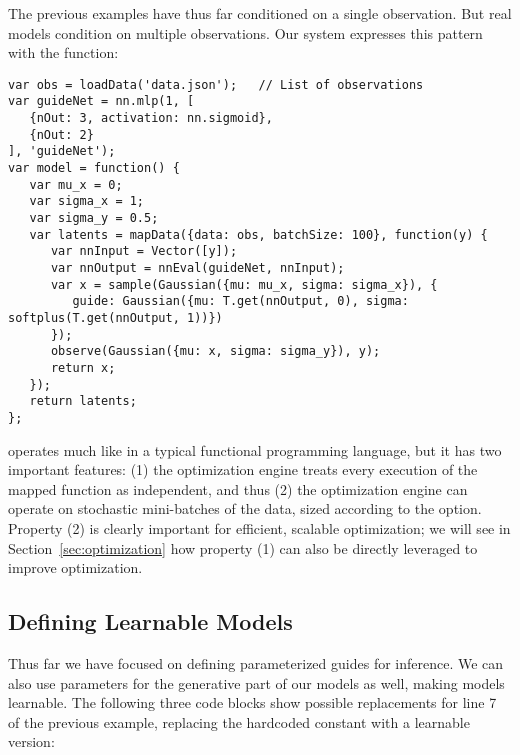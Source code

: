 The previous examples have thus far conditioned on a single observation. But real models condition on multiple observations. Our system expresses this pattern with the  function:
\begin{lstlisting}
var obs = loadData('data.json');   // List of observations
var guideNet = nn.mlp(1, [
   {nOut: 3, activation: nn.sigmoid},
   {nOut: 2}
], 'guideNet');
var model = function() {
   var mu_x = 0;
   var sigma_x = 1;
   var sigma_y = 0.5;
   var latents = mapData({data: obs, batchSize: 100}, function(y) {
      var nnInput = Vector([y]);
      var nnOutput = nnEval(guideNet, nnInput);
      var x = sample(Gaussian({mu: mu_x, sigma: sigma_x}), {
         guide: Gaussian({mu: T.get(nnOutput, 0), sigma: softplus(T.get(nnOutput, 1))})
      });
      observe(Gaussian({mu: x, sigma: sigma_y}), y);
      return x;
   });
   return latents;
};
\end{lstlisting}
 operates much like  in a typical functional programming language, but it has two important features: (1) the optimization engine treats every execution of the mapped function as independent, and thus (2) the optimization engine can operate on stochastic mini-batches of the data, sized according to the  option.
Property (2) is clearly important for efficient, scalable optimization; we will see in Section~\ref{sec:optimization} how property (1) can also be directly leveraged to improve optimization.


\subsection{Defining Learnable Models}

Thus far we have focused on defining parameterized guides for inference.
We can also use parameters for the generative part of our models as well, making models learnable.
The following three code blocks show possible replacements for line 7 of the previous example, replacing the hardcoded constant  with a learnable version:


